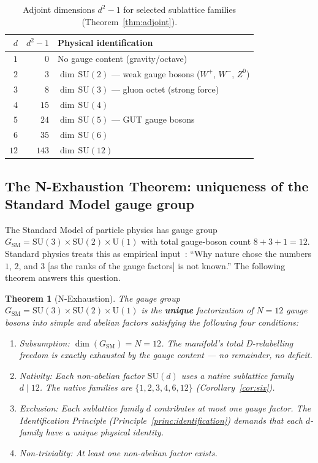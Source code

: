 \documentclass[11pt,a4paper]{article}
\newtheorem{theorem}{Theorem}[section]
\theoremstyle{definition}
\theoremstyle{remark}
\begin{document}
\begin{table}[h]
\centering
\begin{tabular}{@{}r r l@{}}
\toprule
$d$ & $d^{2}-1$ & Physical identification \\
\midrule
$1$ & $0$   & No gauge content (gravity/octave) \\
$2$ & $3$   & $\dim\,\mathrm{SU}(2)$ --- weak gauge bosons ($W^{+}$, $W^{-}$, $Z^{0}$) \\
$3$ & $8$   & $\dim\,\mathrm{SU}(3)$ --- gluon octet (strong force) \\
$4$ & $15$  & $\dim\,\mathrm{SU}(4)$ \\
$5$ & $24$  & $\dim\,\mathrm{SU}(5)$ --- GUT gauge bosons \\
$6$ & $35$  & $\dim\,\mathrm{SU}(6)$ \\
$12$ & $143$ & $\dim\,\mathrm{SU}(12)$ \\
\bottomrule
\end{tabular}
\caption{Adjoint dimensions $d^{2}-1$ for selected sublattice families (Theorem~\ref{thm:adjoint}).}
\label{tab:adjoint-values}
\end{table}

\subsection{The N-Exhaustion Theorem: uniqueness of the Standard Model gauge group}\label{subsec:n-exhaustion}

The Standard Model of particle physics has gauge group $G_{\mathrm{SM}} = \mathrm{SU}(3) \times \mathrm{SU}(2) \times \mathrm{U}(1)$ with total gauge-boson count $8 + 3 + 1 = 12$. Standard physics treats this as empirical input~\cite{Tong}: ``Why nature chose the numbers $1$, $2$, and $3$ [as the ranks of the gauge factors] is not known.'' The following theorem answers this question.

\begin{theorem}[N-Exhaustion]\label{thm:n-exhaustion}
The gauge group $G_{\mathrm{SM}} = \mathrm{SU}(3) \times \mathrm{SU}(2) \times \mathrm{U}(1)$ is the \textbf{unique} factorization of $N = 12$ gauge bosons into simple and abelian factors satisfying the following four conditions:
\begin{enumerate}[label=\textnormal{(C\arabic*)},leftmargin=*]
\item \emph{Subsumption:} $\dim(G_{\mathrm{SM}}) = N = 12$. The manifold's total D-relabelling freedom is exactly exhausted by the gauge content --- no remainder, no deficit.
\item \emph{Nativity:} Each non-abelian factor $\mathrm{SU}(d)$ uses a native sublattice family $d \mid 12$. The native families are $\{1,2,3,4,6,12\}$ (Corollary~\ref{cor:six}).
\item \emph{Exclusion:} Each sublattice family $d$ contributes at most one gauge factor. The Identification Principle (Principle~\ref{princ:identification}) demands that each $d$-family have a unique physical identity.
\item \emph{Non-triviality:} At least one non-abelian factor exists.
\end{enumerate}
\end{theorem}
\end{document}
